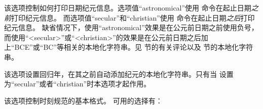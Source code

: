 \begin{optionlist}
该选项控制如何打印日期纪元信息。选项值“astronomical”使用  命令在起止日期\emph{之前}打印纪元信息。
而选项值“secular”和“christian”使用  命令在起止日期\emph{之后}打印纪元信息。
缺省情况下，使用“astronomical”效果是在公元前日期之前使用负号，而使用“<secular>”或“<christian>”的效果是在公元前日期之后加上“BCE”或“BC”等相关的本地化字符串。见  节的有关评论以及  节的本地化字符串。


该选项设置回归年，在其之前自动添加纪元的本地化字符串。只有当  设置为“secular”或者“christian”时本选项才起作用。



该选项控制时刻规范的基本格式。
可用的选择有：


\end{optionlist}
